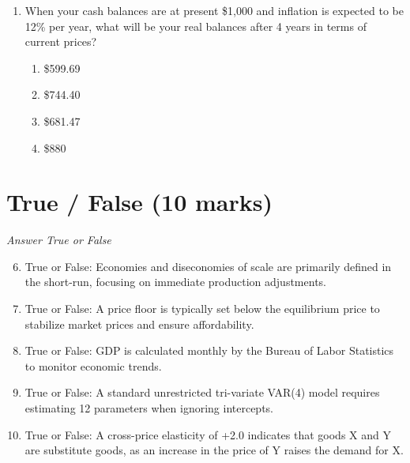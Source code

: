 \documentclass[12pt]{article}
\begin{document}
\begin{enumerate}[label=\arabic*.]
\begin{enumerate}[label=(\alph*)]
    \item Interest is the penalty for early consumption
    \item Interest is the reward for immediate consumption
    \item Interest is a fee charged by banks independent of market forces
    \item Interest rates fluctuate based on the phases of the moon
    \item Interest is a tax on savings that discourages postponing consumption
\end{enumerate}
\item When your cash balances are at present \$1,000 and inflation is expected to be 12\% per year, what will be your real balances after 4 years in terms of current prices?
\begin{enumerate}[label=(\alph*)]
    \item \$599.69
    \item \$744.40
    \item \$681.47
    \item \$880
\end{enumerate}
\end{enumerate}

\section*{True / False (10 marks)}
\textit{Answer True or False}
\begin{enumerate}[label=\arabic*.]
\setcounter{enumi}{5}
\item True or False: Economies and diseconomies of scale are primarily defined in the short-run, focusing on immediate production adjustments.
\item True or False: A price floor is typically set below the equilibrium price to stabilize market prices and ensure affordability.
\item True or False: GDP is calculated monthly by the Bureau of Labor Statistics to monitor economic trends.
\item True or False: A standard unrestricted tri-variate VAR(4) model requires estimating 12 parameters when ignoring intercepts.
\item True or False: A cross-price elasticity of +2.0 indicates that goods X and Y are substitute goods, as an increase in the price of Y raises the demand for X.
\end{enumerate}
\end{document}
